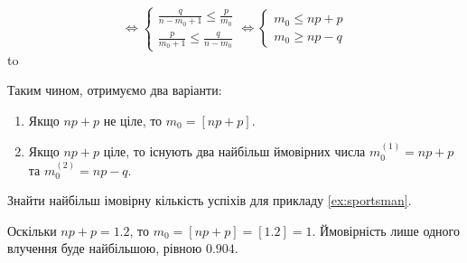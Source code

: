 $$
\Leftrightarrow
\begin{cases}
    \frac{q}{n-m_0+1} \leq \frac{p}{m_0} \\
    \frac{p}{m_0 + 1} \leq \frac{q}{n-m_0}
\end{cases}
\Leftrightarrow
\begin{cases}
    m_0 \leq np+p\\
    m_0 \geq np-q
\end{cases}
$$
\hbox to 

Таким чином, отримуємо два варіанти:
\begin{enumerate}
    \item Якщо $np+p$ не ціле, то $m_0 = \left[np+p\right]$.
    \item Якщо $np+p$ ціле, то існують два найбільш ймовірних числа $m_0^{(1)} = np+p$ та $m_0^{(2)} = np-q$.
\end{enumerate}

\begin{example}
    Знайти найбільш імовірну кількість успіхів для прикладу \ref{ex:sportsman}.

    Оскільки $np + p = 1.2$, то $m_0 = \left[np + p\right] = \left[1.2\right] = 1$.
    Ймовірність лише одного влучення буде найбільшою, рівною $0.904$.
\end{example}


